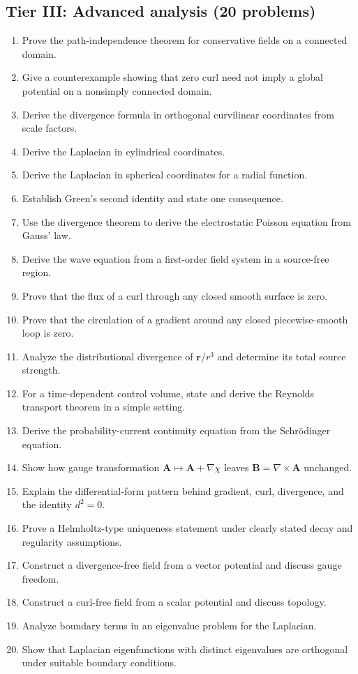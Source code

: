 \subsection*{Tier III: Advanced analysis (20 problems)}
\begin{enumerate}[label=\textbf{\arabic*.},leftmargin=*]
\item Prove the path-independence theorem for conservative fields on a connected domain.
\item Give a counterexample showing that zero curl need not imply a global potential on a nonsimply connected domain.
\item Derive the divergence formula in orthogonal curvilinear coordinates from scale factors.
\item Derive the Laplacian in cylindrical coordinates.
\item Derive the Laplacian in spherical coordinates for a radial function.
\item Establish Green's second identity and state one consequence.
\item Use the divergence theorem to derive the electrostatic Poisson equation from Gauss' law.
\item Derive the wave equation from a first-order field system in a source-free region.
\item Prove that the flux of a curl through any closed smooth surface is zero.
\item Prove that the circulation of a gradient around any closed piecewise-smooth loop is zero.
\item Analyze the distributional divergence of $\mathbf r/r^3$ and determine its total source strength.
\item For a time-dependent control volume, state and derive the Reynolds transport theorem in a simple setting.
\item Derive the probability-current continuity equation from the Schrödinger equation.
\item Show how gauge transformation $\mathbf A\mapsto\mathbf A+\nabla\chi$ leaves $\mathbf B=\nabla\times\mathbf A$ unchanged.
\item Explain the differential-form pattern behind gradient, curl, divergence, and the identity $d^2=0$.
\item Prove a Helmholtz-type uniqueness statement under clearly stated decay and regularity assumptions.
\item Construct a divergence-free field from a vector potential and discuss gauge freedom.
\item Construct a curl-free field from a scalar potential and discuss topology.
\item Analyze boundary terms in an eigenvalue problem for the Laplacian.
\item Show that Laplacian eigenfunctions with distinct eigenvalues are orthogonal under suitable boundary conditions.
\end{enumerate}
